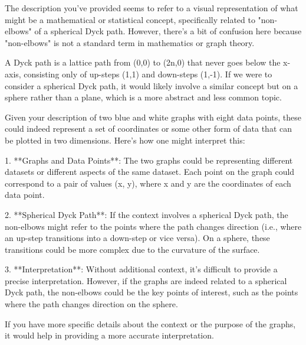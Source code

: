 The description you've provided seems to refer to a visual representation of what might be a mathematical or statistical concept, specifically related to "non-elbows" of a spherical Dyck path. However, there's a bit of confusion here because "non-elbows" is not a standard term in mathematics or graph theory.

A Dyck path is a lattice path from (0,0) to (2n,0) that never goes below the x-axis, consisting only of up-steps (1,1) and down-steps (1,-1). If we were to consider a spherical Dyck path, it would likely involve a similar concept but on a sphere rather than a plane, which is a more abstract and less common topic.

Given your description of two blue and white graphs with eight data points, these could indeed represent a set of coordinates or some other form of data that can be plotted in two dimensions. Here’s how one might interpret this:

1. **Graphs and Data Points**: The two graphs could be representing different datasets or different aspects of the same dataset. Each point on the graph could correspond to a pair of values (x, y), where x and y are the coordinates of each data point.

2. **Spherical Dyck Path**: If the context involves a spherical Dyck path, the non-elbows might refer to the points where the path changes direction (i.e., where an up-step transitions into a down-step or vice versa). On a sphere, these transitions could be more complex due to the curvature of the surface.

3. **Interpretation**: Without additional context, it's difficult to provide a precise interpretation. However, if the graphs are indeed related to a spherical Dyck path, the non-elbows could be the key points of interest, such as the points where the path changes direction on the sphere.

If you have more specific details about the context or the purpose of the graphs, it would help in providing a more accurate interpretation.